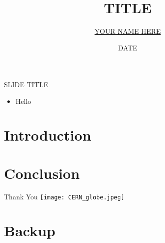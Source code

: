 \documentclass[aspectratio=169]{beamer}
\title[TITLE]
{TITLE}
\author[YOUR NAME HERE]
{\texorpdfstring{\underline{YOUR NAME HERE}}{YOUR NAME HERE}\inst{\dag}}
\institute[NIU] {\inst{\dag}Northern Illinois University, USA}
\date{DATE}
\begin{document}
\frame{\titlepage}




\begin{frame}{SLIDE TITLE}
\begin{itemize}
\item{Hello}
\end{itemize}
\end{frame}


\section{Introduction}


\section{Conclusion}

\begin{frame}{Thank You}
\centering
\texttt{[image: CERN\_globe.jpeg]} %
\end{frame}

\appendix

\section{Backup }
\end{document}
